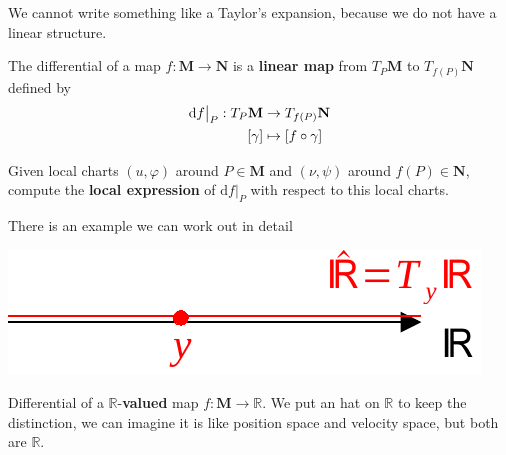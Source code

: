 \documentclass[../main.tex]{subfiles}
\begin{document}
We cannot write something like a Taylor's expansion, because we do not have a linear structure.
\begin{definition}
The differential of a map $f:\mathbf{M}\to\mathbf{N}$ is a \textbf{linear map} from $T_P\mathbf{M}$ to $T_{f(P)}\mathbf{N}$ defined by
\[
\begin{split}
\textrm{d}f\big|_P : T_P\mathbf{M}& \to  T_{f(P)}\mathbf{N}\\
\qty[\gamma] &\mapsto \qty[f\circ \gamma]
\end{split}
\]
\end{definition}
\begin{example}
Given local charts $(u,\varphi)$ around $P\in\mathbf{M}$ and  $(\nu,\psi)$ around $f(P)\in\mathbf{N}$, compute the \textbf{local expression} of $\textrm{d}f\big|_P$ with respect to this local charts.
\end{example}
There is an example we can work out in detail
\begin{marginfigure}[8mm]
	\includegraphics[width=1.2\linewidth]{images/differential_of_a_R_valued_map.pdf}
	\caption[Differential of a $\mathbb{R}$-\textbf{valued} map \(f:\mathbf{M}\to\mathbb{R}\)]{Differential of a $\mathbb{R}$-\textbf{valued} map \(f:\mathbf{M}\to\mathbb{R}\). We put an hat on $\mathbb{R}$ to keep the distinction, we can imagine it is like position space and velocity space, but both are $\mathbb{R}$.}
\end{marginfigure}
\end{document}
